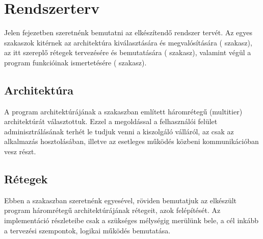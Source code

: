 \chapter{Rendszerterv}\label{sect:rszterv}

Jelen fejezetben szeretnénk bemutatni az elkészítendő rendszer tervét. Az egyes szakaszok kitérnek az architektúra kiválasztására és megvalósítására ( szakasz), az itt szereplő rétegek tervezésére és bemutatására ( szakasz), valamint végül a program funkcióinak ismertetésére ( szakasz).

\section{Architektúra}\label{sect:architektura}

A program architektúrájának a  szakaszban említett háromrétegű (multitier) architektúrát választottuk. Ezzel a megoldással a felhasználói felület adminisztrálásának terhét le tudjuk venni a kiszolgáló válláról, az csak az alkalmazás hosztolásában, illetve az esetleges működés közbeni kommunikációban vesz részt.


\section{Rétegek}\label{sect:retegek}

Ebben a szakaszban szeretnénk egyesével, röviden bemutatjuk az elkészült program háromrétegű architektúrájának rétegeit, azok felépítését. Az implementáció részleteibe csak a szükséges mélységig merülünk bele, a cél inkább a tervezési szempontok, logikai működés bemutatása.

